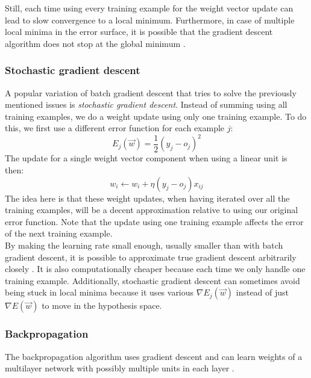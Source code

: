 Still, each time using every training example for the weight vector update can lead to slow convergence to a local minimum. Furthermore, in case of multiple local minima in the error surface, it is possible that the gradient descent algorithm does not stop at the global minimum \citep{ML}.

\subsubsection{Stochastic gradient descent} %
\label{ssub:stochastic_gradient_descent}
A popular variation of batch gradient descent that tries to solve the previously mentioned issues is \textit{stochastic gradient descent}. Instead of summing using all training examples, we do a weight update using only one training example. To do this, we first use a different error function for each example $j$:
\begin{equation}
    E_j(\overrightarrow{w}) = \frac{1}{2}(y_j - o_j)^2
\end{equation}
The update for a single weight vector component when using a linear unit is then:
\begin{equation}
    w_i \gets w_i + \eta (y_j- o_j)x_{ij}
\end{equation}
The idea here is that these weight updates, when having iterated over all the training examples, will be a decent approximation relative to using our original error function. Note that the update using one training example affects the error of the next training example.\\

By making the learning rate small enough, usually smaller than with batch gradient descent, it is possible to approximate true gradient descent arbitrarily closely \citep{ML}.
It is also computationally cheaper because each time we only handle one training example.
Additionally, stochastic gradient descent can sometimes avoid being stuck in local minima because it uses various $\nabla E_j(\overrightarrow{w})$ instead of just $\nabla E(\overrightarrow{w})$ to move in the hypothesis space.

\subsubsection{Backpropagation} %
\label{ssub:backpropagation}
The backpropagation algorithm uses gradient descent and can learn weights of a multilayer network with possibly multiple units in each layer \citep{rumelhart1986learning}.


